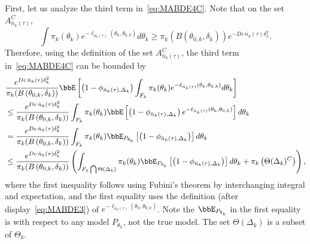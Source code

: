 \documentclass[11pt]{article}
\begin{document}
First, let us analyze the third term in~\eqref{eq:MABDE4C}. Note that on the set $A_{\bar n_k(\tau)}^C$,
\[\int \pi_k(\theta_k) e^{-\ell_{\bar n_k(\tau)}(\theta_k,\theta_{0,k})}d\theta_k \geq \pi_k(B\left(\theta_{0,k},\delta_k \right))e^{-D c\, \bar n_k(\tau) \delta_k^2} .\]
 Therefore, using the definition of the set $A_{\bar n_k(\tau)}^C$, the third term in~\eqref{eq:MABDE4C} can be bounded by
\begin{align}
\nonumber
   &\frac{e^{D c\, \bar n_k(\tau) \delta_k^2}}{\pi_k(B\left(\theta_{0,k},\delta_k \right))} \bbE \left[ \left(1-\phi_{\bar n_k(\tau),\Delta_k}\right)  {  \int_{F_k} \pi_k(\theta_k) e^{-\ell_{\bar n_k(\tau)}(\theta_k,\theta_{0,k})}d\theta_k } \right]
   \\
   \nonumber
   &\leq  \frac{e^{D c\, \bar n_k(\tau) \delta_k^2}}{\pi_k(B\left(\theta_{0,k},\delta_k \right))} \int_{F_k} \pi_k(\theta_k) \bbE \left[ \left(1-\phi_{\bar n_k(\tau),\Delta_k}\right)     e^{-\ell_{\bar n_k(\tau)}(\theta_k,\theta_{0,k})}\right] d\theta_k  
   \\
   \nonumber
   &=  \frac{e^{D c\, \bar n_k(\tau) \delta_k^2}}{\pi_k(B\left(\theta_{0,k},\delta_k \right))} \int_{F_k} \pi_k(\theta_k) \bbE_{P_{\theta_k}} \left[ \left(1-\phi_{\bar n_k(\tau),\Delta_k}\right)  \right] d\theta_k 
   \\
   &\leq \frac{e^{D c\, \bar n_k(\tau) \delta_k^2}}{\pi_k(B\left(\theta_{0,k},\delta_k \right))} \left( \int_{F_k\bigcap \Theta(\Delta_k)} \pi_k(\theta_k) \bbE_{P_{\theta_k}} \left[ \left(1-\phi_{\bar n_k(\tau),\Delta_k}\right)  \right] d\theta_k + \pi_k\left(\Theta(\Delta_k)^C\right)\right),
   \label{eq:MABDE11C}
\end{align}
where the first inequality follows using Fubini's theorem by interchanging integral and expectation, and the first equality uses the definition (after display~\eqref{eq:MABDE3}) of $e^{-\ell_{\bar n_k(\tau)}(\theta_k,\theta_{0,k})}$. Note the $\bbE_{P_{\theta_k}}$ in the first equality is with respect to any model $P_{\theta_k}$, not the true model. The set $\Theta(\Delta_k)$ is a subset of $\Theta_k$. 
\end{document}
